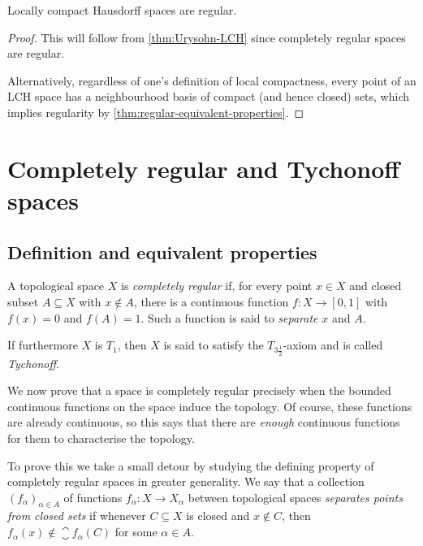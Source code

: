 \documentclass[article, a4paper, 11pt, oneside]{memoir}
\numberwithin{equation}{chapter}
\begin{document}
\begin{corollary}
    Locally compact Hausdorff spaces are regular.
\end{corollary}

\begin{proof}
    This will follow from \cref{thm:Urysohn-LCH} since completely regular spaces are regular.

    Alternatively, regardless of one's definition of local compactness, every point of an LCH space has a neighbourhood basis of compact (and hence closed) sets, which implies regularity by \cref{thm:regular-equivalent-properties}.
\end{proof}



\chapter{Completely regular and Tychonoff spaces}

\section{Definition and equivalent properties}

\begin{definition}
    A topological space $X$ is \emph{completely regular} if, for every point $x \in X$ and closed subset $A \subseteq X$ with $x \not\in A$, there is a continuous function $f \colon X \to [0,1]$ with $f(x) = 0$ and $f(A) = 1$. Such a function is said to \emph{separate} $x$ and $A$.

    If furthermore $X$ is $T_1$, then $X$ is said to satisfy the $T_{3\frac{1}{2}}$-axiom and is called \emph{Tychonoff}.
\end{definition}


We now prove that a space is completely regular precisely when the bounded continuous functions on the space induce the topology. Of course, these functions are already continuous, so this says that there are \emph{enough} continuous functions for them to characterise the topology.

To prove this we take a small detour by studying the defining property of completely regular spaces in greater generality. We say that a collection $(f_\alpha)_{\alpha \in A}$ of functions $f_\alpha \colon X \to X_\alpha$ between topological spaces \emph{separates points from closed sets} if whenever $C \subseteq X$ is closed and $x \not\in C$, then $f_\alpha(x) \not\in \closure{f_\alpha(C)}$ for some $\alpha \in A$.
\end{document}
